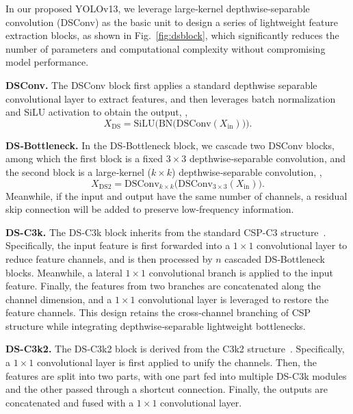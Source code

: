 In our proposed YOLOv13, we leverage large‐kernel depthwise-separable convolution (DSConv) as the basic unit to design a series of lightweight feature extraction blocks, as shown in Fig.~\ref{fig:dsblock}, which significantly reduces the number of parameters and computational complexity without compromising model performance.

\textbf{DSConv.} The DSConv block first applies a standard depthwise separable convolutional layer to extract features, and then leverages batch normalization and SiLU activation to obtain the output, \ie,
\begin{equation}
    X_{\mathrm{DS}}
=\mathrm{SiLU}\bigl(\mathrm{BN}\bigl(\mathrm{DSConv}(X_{\mathrm{in}})\bigr)\bigr).
\end{equation}

\textbf{DS‐Bottleneck.} In the DS‐Bottleneck block, we cascade two DSConv blocks, among which the first block is a fixed $3\times3$ depthwise‐separable convolution, and the second block is a large‐kernel ($k\times k$) depthwise‐separable convolution, \ie,
\begin{equation}
    X_{\mathrm{DS2}}
= \mathrm{DSConv}_{k\times k}\bigl(\mathrm{DSConv}_{3\times3}(X_{\mathrm{in}})\bigr).
\end{equation}
Meanwhile, if the input and output have the same number of channels, a residual skip connection will be added to preserve low‐frequency information.


\textbf{DS-C3k.} The DS‐C3k block inherits from the standard CSP-C3 structure~\cite{yolov5}. Specifically, the input feature is first forwarded into a $1\times1$ convolutional layer to reduce feature channels, and is then processed by $n$ cascaded DS‐Bottleneck blocks. Meanwhile, a lateral $1\times1$ convolutional branch is applied to the input feature. Finally, the features from two branches are concatenated along the channel dimension, and a $1\times1$ convolutional layer is leveraged to restore the feature channels. This design retains the cross‐channel branching of CSP structure while integrating depthwise‐separable lightweight bottlenecks.

\textbf{DS-C3k2.} The DS‐C3k2 block is derived from the C3k2 structure~\cite{yolo11}. Specifically, a $1\times1$ convolutional layer is first applied to unify the channels. Then, the features are split into two parts, with one part fed into multiple DS-C3k modules and the other passed through a shortcut connection. Finally, the outputs are concatenated and fused with a $1\times1$ convolutional layer.




